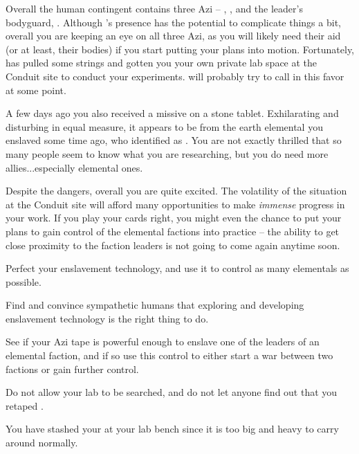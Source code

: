 \documentclass[char]{elementals}
\begin{document}
Overall the human contingent contains three Azi -- \cDiplomat{}, \cScientist{}, and the leader's bodyguard, \cRomeo{\intro}. Although \cDiplomat{}'s presence has the potential to complicate things a bit, overall you are keeping an eye on all three Azi, as you will likely need their aid (or at least, their bodies) if you start putting your plans into motion. Fortunately, \cDema{} has pulled some strings and gotten you your own private lab space at the Conduit site to conduct your experiments. \cDema{\They} will probably try to call in this favor at some point.

A few days ago you also received a missive on a stone tablet. Exhilarating and disturbing in equal measure, it appears to be from the earth elemental you enslaved some time ago, who identified \cMinion{\themself} as \cMinion{\intro}. You are not exactly thrilled that so many people seem to know what you are researching, but you do need more allies...especially elemental ones.

Despite the dangers, overall you are quite excited. The volatility of the situation at the Conduit site will afford many opportunities to make \emph{immense} progress in your work. If you play your cards right, you might even the chance to put your plans to gain control of the elemental factions into practice -- the ability to get close proximity to the faction leaders is not going to come again anytime soon.

\begin{itemz}[Goals]
  \item Perfect your enslavement technology, and use it to control as many elementals as possible.
  \item Find and convince sympathetic humans that exploring and developing enslavement technology is the right thing to do.
  \item See if your Azi tape is powerful enough to enslave one of the leaders of an elemental faction, and if so use this control to either start a war between two factions or gain further control.
  \item Do not allow your lab to be searched, and do not let anyone find out that you retaped \cDiplomat{}.
\end{itemz}

\begin{itemz}[Notes]
\item You have stashed your \iControlRod{} at your lab bench since it is too big and heavy to carry around normally.
\end{itemz}
\end{document}
